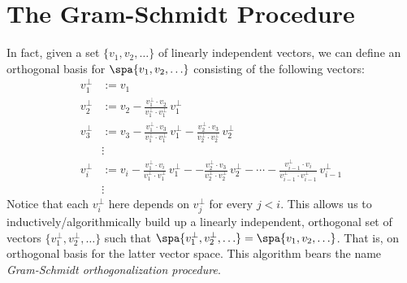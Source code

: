 \section{The Gram-Schmidt Procedure}
In fact, given a set $\{v_1, v_2, \ldots \}$ of linearly independent vectors, we can define an orthogonal basis for $\spa \{v_1,v_2, \ldots \}$ consisting of the following vectors:
\begin{align*}
v_1^\perp&:=v_1 \\
v_2^\perp &:= v_2 - \frac{v_1^\perp\cdot v_2}{v_1^\perp\cdot v_1^\perp}\,v_1^\perp \\
v_3^\perp &:= v_3 - \frac{v_1^\perp\cdot v_3}{v_1^\perp\cdot v_1^\perp}\,v_1^\perp - \frac{v_2^\perp\cdot v_3}{v_2^\perp\cdot v_2^\perp}\,v_2^\perp\\
&\vdots \\
v_i^\perp%
 &:= v_i - \frac{v_1^\perp\cdot v_i}{v_1^\perp\cdot v_1^\perp}\,v_1^\perp -  
 - \frac{v_2^\perp\cdot v_3}{v_2^\perp\cdot v_2^\perp}\,v_2^\perp -\cdots
 - \frac{v_{i-1}^\perp\cdot v_i}{v_{i-1}^\perp\cdot v_{i-1}^\perp}\,v_{i-1}^\perp\\
&\vdots
\end{align*}
Notice that each $v_i^\perp$ here depends on  $v_j^\perp$ for every $j<i$.  This allows us to inductively/algorithmically build up a linearly independent, orthogonal set of vectors 
$\{v_1^\perp,v_2^\perp, \ldots \}$ 
such that 
$\spa \{v_1^\perp,v_2^\perp, \ldots \}=\spa \{v_1, v_2, \ldots \}$. That is, on orthogonal basis for the latter vector space. This algorithm bears the name \emph{Gram-Schmidt orthogonalization procedure}\label{GramSchmidt}.

